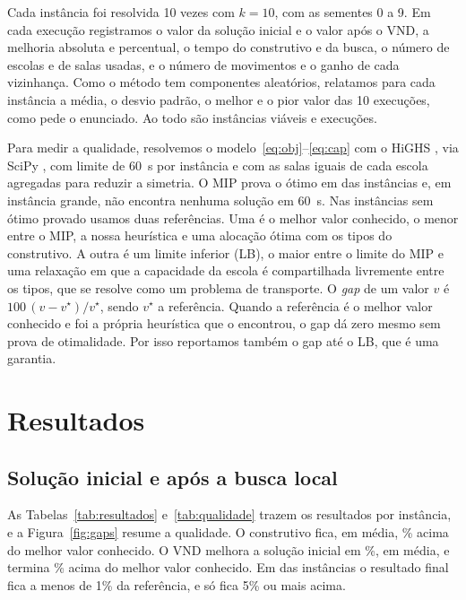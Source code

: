 \documentclass[12pt]{article}
\begin{document}
Cada instância foi resolvida 10 vezes com $k = 10$, com as sementes 0 a 9. Em cada execução
registramos o valor da solução inicial e o valor após o VND, a melhoria absoluta e percentual, o
tempo do construtivo e da busca, o número de escolas e de salas usadas, e o número de movimentos e o
ganho de cada vizinhança. Como o método tem componentes aleatórios, relatamos para cada instância
a média, o desvio padrão, o melhor e o pior valor das 10 execuções, como pede o enunciado. Ao todo
são \nInst{} instâncias viáveis e \nExec{} execuções.

Para medir a qualidade, resolvemos o modelo~\eqref{eq:obj}--\eqref{eq:cap} com o HiGHS
\cite{huangfu2018}, via SciPy \cite{virtanen2020}, com limite de 60~s por instância e com as salas
iguais de cada escola agregadas para reduzir a simetria. O MIP prova o ótimo em  das
\nInst{} instâncias e, em \semMip{} instância grande, não encontra nenhuma solução em 60~s. Nas
instâncias sem ótimo provado usamos duas referências. Uma é o melhor valor conhecido, o menor entre
o MIP, a nossa heurística e uma alocação ótima com os tipos do construtivo. A outra é um limite
inferior (LB), o maior entre o limite do MIP e uma relaxação em que a capacidade da escola é
compartilhada livremente entre os tipos, que se resolve como um problema de transporte. O
\emph{gap} de um valor $v$ é $100\,(v - v^\star)/v^\star$, sendo $v^\star$ a referência. Quando a
referência é o melhor valor conhecido e foi a própria heurística que o encontrou, o gap dá zero
mesmo sem prova de otimalidade. Por isso reportamos também o gap até o LB, que é uma garantia.

\section{Resultados}\label{sec:resultados}

\subsection{Solução inicial e após a busca local}

As Tabelas~\ref{tab:resultados} e~\ref{tab:qualidade} trazem os resultados por instância, e a
Figura~\ref{fig:gaps} resume a qualidade. O construtivo fica, em média, \gapIni\% acima do melhor
valor conhecido. O VND melhora a solução inicial em \melhoria\%, em média, e termina \gapFin\%
acima do melhor valor conhecido. Em \abaixoUm{} das \nInst{} instâncias o resultado final fica a
menos de 1\% da referência, e só \acimaCinco{} fica 5\% ou mais acima.
\end{document}
